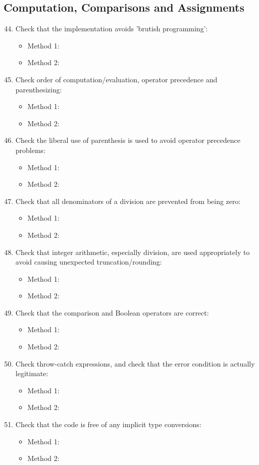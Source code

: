 \subsection{Computation, Comparisons and Assignments}
\begin{enumerate}
	\setcounter{enumi}{43}
	\item Check that the implementation avoids 'brutish programming':
	\begin{itemize}
		\item Method 1: \cmark
		\item Method 2: \cmark
	\end{itemize}
	\item Check order of computation/evaluation, operator precedence and parenthesizing:
	\begin{itemize}
		\item Method 1: \cmark
		\item Method 2: \cmark
	\end{itemize}
	\item Check the liberal use of parenthesis is used to avoid operator precedence problems:
	\begin{itemize}
		\item Method 1: \cmark
		\item Method 2: \cmark
	\end{itemize}
	\item Check that all denominators of a division are prevented from being zero:
	\begin{itemize}
		\item Method 1: \cmark
		\item Method 2: \cmark
	\end{itemize}
	\item Check that integer arithmetic, especially division, are used appropriately to avoid causing unexpected truncation/rounding:
	\begin{itemize}
		\item Method 1: \cmark
		\item Method 2: \cmark
	\end{itemize}
	\item Check that the comparison and Boolean operators are correct:
	\begin{itemize}
		\item Method 1: \cmark
		\item Method 2: \cmark
	\end{itemize}
	\item Check throw-catch expressions, and check that the error condition is actually legitimate:
	\begin{itemize}
		\item Method 1: \cmark
		\item Method 2: \cmark
	\end{itemize}
	\item Check that the code is free of any implicit type conversions:
	\begin{itemize}
		\item Method 1: \cmark
		\item Method 2: \cmark
	\end{itemize}
\end{enumerate}